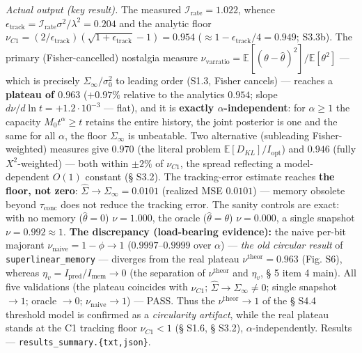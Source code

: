 \documentclass[12pt]{iopart}
\begin{document}
\emph{Actual output (key result).} The measured \(\mathcal I_{\text{rate}} = 1.022\), whence \(\epsilon_{\text{track}} = \mathcal I_{\text{rate}}\sigma^2/\lambda^2 = 0.204\) and the analytic floor \(\nu_{C1} = (2/\epsilon_{\text{track}})(\sqrt{1+\epsilon_{\text{track}}}-1) = 0.954\) (\(\approx 1-\epsilon_{\text{track}}/4 = 0.949\); S3.3b). The primary (Fisher-cancelled) nostalgia measure \(\nu_{\text{varratio}} = \mathbb{E}[(\theta-\hat\theta)^2]/\mathbb{E}[\theta^2]\) --- which is precisely \(\Sigma_\infty/\sigma_0^2\) to leading order (S1.3, Fisher cancels) --- reaches a \textbf{plateau of \(0.963\)} (\(+0.97\%\) relative to the analytics \(0.954\); slope \(d\nu/d\ln t = +1.2\cdot10^{-3}\) --- flat), and it is \textbf{exactly \(\alpha\)-independent}: for \(\alpha \ge 1\) the capacity \(M_0 t^\alpha \ge t\) retains the entire history, the joint posterior is one and the same for all \(\alpha\), the floor \(\Sigma_\infty\) is unbeatable. Two alternative (subleading Fisher-weighted) measures give \(0.970\) (the literal problem \(\mathbb{E}[D_{KL}]/I_{\text{opt}}\)) and \(0.946\) (fully \(X^2\)-weighted) --- both within \(\pm2\%\) of \(\nu_{C1}\), the spread reflecting a model-dependent \(O(1)\) constant (§ S3.2). The tracking-error estimate reaches \textbf{the floor, not zero}: \(\hat\Sigma \to \Sigma_\infty = 0.0101\) (realized MSE \(0.0101\)) --- memory obsolete beyond \(\tau_{\text{conc}}\) does not reduce the tracking error. The sanity controls are exact: with no memory (\(\hat\theta = 0\)) \(\nu = 1.000\), the oracle (\(\hat\theta = \theta\)) \(\nu = 0.000\), a single snapshot \(\nu = 0.992\approx1\). \textbf{The discrepancy (load-bearing evidence):} the naive per-bit majorant \(\nu_{\text{naive}} = 1-\phi \to 1\) (\(0.9997\)--\(0.9999\) over \(\alpha\)) --- \emph{the old circular result} of \texttt{superlinear\_memory} --- diverges from the real plateau \(\nu^{\text{theor}} = 0.963\) (Fig. S6), whereas \(\eta_v = I_{\text{pred}}/I_{\text{mem}} \to 0\) (the separation of \(\nu^{\text{theor}}\) and \(\eta_v\), § 5 item 4 main). All five validations (the plateau coincides with \(\nu_{C1}\); \(\hat\Sigma\to\Sigma_\infty\neq0\); single snapshot \(\to1\); oracle \(\to0\); \(\nu_{\text{naive}}\to1\)) --- PASS. Thus the \(\nu^{\text{theor}}\to1\) of the § S4.4 threshold model is confirmed as a \emph{circularity artifact}, while the real plateau stands at the C1 tracking floor \(\nu_{C1}<1\) (§ S1.6, § S3.2), \(\alpha\)-independently. Results --- \texttt{results\_summary.\{txt,json\}}.
\end{document}
